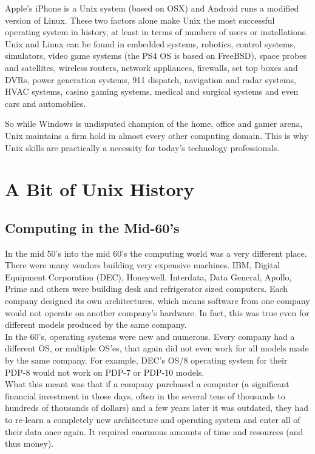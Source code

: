 Apple's iPhone is a Unix system (based on OSX) and Android runs a modified version of Linux. These two factors alone make Unix the most successful operating system in history, at least in terms of numbers of users or installations.\\

Unix and Linux can be found in embedded systems, robotics, control systems, simulators, video game systems (the PS4 OS is based on FreeBSD), space probes and satellites, wireless routers, network appliances, firewalls, set top boxes and DVRs, power generation systems, 911 dispatch, navigation and radar systems, HVAC systems, casino gaming systems, medical and surgical systems and even cars and automobiles.

So while Windows is undisputed champion of the home, office and gamer arena, Unix maintains a firm hold in almost every other computing domain.  This is why Unix skills are practically a necessity for today's technology professionals.

\section{A Bit of Unix History}

\subsection{Computing in the Mid-60's}

In the mid 50's into the mid 60's the computing world was a very different place.  There were many vendors building very expensive machines.  IBM, Digital Equipment Corporation (DEC), Honeywell, Interdata, Data General, Apollo, Prime and others were building desk and refrigerator sized computers.  Each company designed its own architectures, which means software from one company would not operate on another company's hardware.  In fact, this was true even for different models produced by the same company.\\

In the 60's, operating systems were new and numerous.  Every company had a different OS, or multiple OS'es, that again did not even work for all models made by the same company.  For example, DEC's OS/8 operating system for their PDP-8 would not work on PDP-7 or PDP-10 models.\\

What this meant was that if a company purchased a computer (a significant financial investment in those days, often in the several tens of thousands to hundreds of thousands of dollars) and a few years later it was outdated, they had to re-learn a completely new architecture and operating system and enter all of their data once again.  It required enormous amounts of time and resources (and thus money).\\

